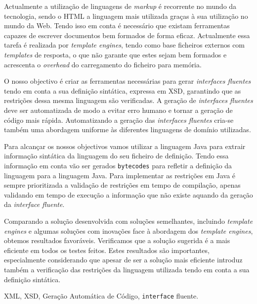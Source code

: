 \abstractPT  %

Actualmente a utilização de linguagens de \textit{markup} é recorrente no mundo da tecnologia, sendo o \ac{HTML} a linguagem mais utilizada graças à sua utilização no mundo da Web. Tendo isso em conta é necessário que existam ferramentas capazes de escrever documentos bem formados de forma eficaz. Actualmente essa tarefa é realizada por \textit{template engines}, tendo como base ficheiros externos com \textit{templates} de resposta, o que não garante que estes sejam bem formados e acrescenta o \textit{overhead} do carregamento do ficheiro para memória.

\noindent
O nosso objectivo é criar as ferramentas necessárias para gerar \textit{interfaces fluentes} tendo em conta a sua definição sintática, expressa em \ac{XSD}, garantindo que as restrições dessa mesma linguagem são verificadas. A geração de \textit{interfaces fluentes} deve ser automatizada de modo a evitar erro humano e tornar a geração de código mais rápida. Automatizando a geração das \textit{interfaces fluentes} cria-se também uma abordagem uniforme às diferentes linguagens de domínio utilizadas.

\noindent
Para alcançar os nossos objectivos vamos utilizar a linguagem Java para extrair informação sintática da linguagem do seu ficheiro de definição. Tendo essa informação em conta vão ser gerados \texttt{bytecodes} para refletir a definição da linguagem para a linguagem Java. Para implementar as restrições em Java é sempre prioritizada a validação de restrições em tempo de compilação, apenas validando em tempo de execução a informação que não existe aquando da geração da \textit{interface fluente}.

\noindent
Comparando a solução desenvolvida com soluções semelhantes, incluindo \textit{template engines} e algumas soluções com inovações face à abordagem dos \textit{template engines}, obtemos resultados favoráveis. Verificamos que a solução sugerida é a mais eficiente em todos os testes feitos. Estes resultados são importantes, especialmente considerando que apesar de ser a solução mais eficiente introduz também a verificação das restrições da linguagem utilizada tendo em conta a sua definição sintática.

\begin{keywords}
XML, XSD, Geração Automática de Código, \texttt{interface} fluente.
\end{keywords}
